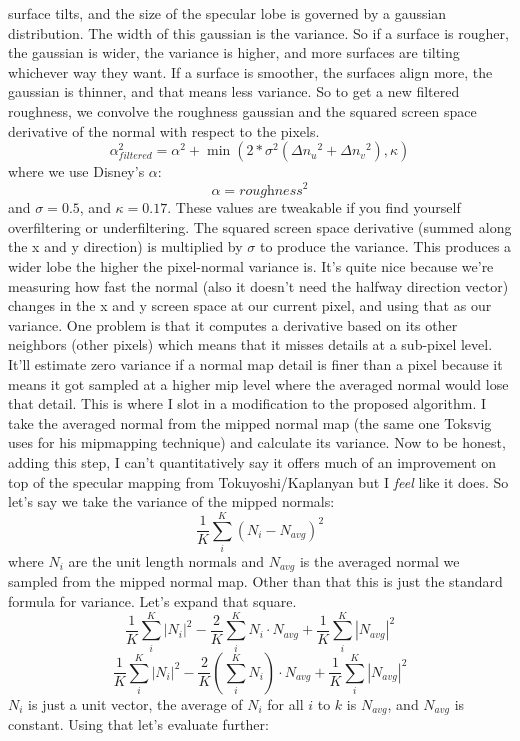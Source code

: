\documentclass{article}
\begin{document}
surface tilts, and the size of the specular lobe is governed by a gaussian distribution. The width of this gaussian is the variance. So if a surface is rougher, the gaussian is wider, the variance is higher, and more surfaces are tilting whichever way they want. If a surface is smoother, the surfaces align more, the gaussian is thinner, and that means less variance. So to get a new filtered roughness, we convolve the roughness gaussian and the squared screen space derivative of the normal with respect to the pixels.
\[\alpha_{\textit{filtered}}^2 = \alpha^{2} + \min(2*\sigma^2({\Delta{n_u}^2 + \Delta{n_v}^2}), \kappa)\]
where we use Disney's \(\alpha\):
\[\alpha = \textit{roughness}^2\]
and \(\sigma = 0.5\), and \(\kappa = 0.17\). These values are tweakable if you find yourself overfiltering or underfiltering. The squared screen space derivative (summed along the x and y direction) is multiplied by \(\sigma\) to produce the variance. This produces a wider lobe the higher the pixel-normal variance is. It's quite nice because we're measuring how fast the normal (also it doesn't need the halfway direction vector) changes in the x and y screen space at our current pixel, and using that as our variance. One problem is that it computes a derivative based on its other neighbors (other pixels) which means that it misses details at a sub-pixel level. It'll estimate zero variance if a normal map detail is finer than a pixel because it means it got sampled at a higher mip level where the averaged normal would lose that detail. This is where I slot in a modification to the proposed algorithm. I take the averaged normal from the mipped normal map (the same one Toksvig uses for his mipmapping technique) and calculate its variance. Now to be honest, adding this step, I can't quantitatively say it offers much of an improvement on top of the specular mapping from Tokuyoshi/Kaplanyan but I \emph{feel} like it does. So let's say we take the variance of the mipped normals:
\[\frac{1}{K} \sum_{i}^{K} (N_i - N_{avg})^2\]
where \(N_i\) are the unit length normals and \(N_{avg}\) is the averaged normal we sampled from the mipped normal map. Other than that this is just the standard formula for variance. Let's expand that square.
\[\frac{1}{K} \sum_{i}^{K} \left|N_i\right|^2 - \frac{2}{K} \sum_{i}^{K} N_i \cdot N_{avg} + \frac{1}{K} \sum_{i}^{K} \left|N_{avg}\right|^2\]
\[\frac{1}{K} \sum_{i}^{K} \left|N_i\right|^2 - \frac{2}{K} (\sum_{i}^{K} N_i) \cdot N_{avg} + \frac{1}{K} \sum_{i}^{K} \left|N_{avg}\right|^2\]
\(N_i\) is just a unit vector, the average of \(N_i\) for all \(i\) to \(k\) is \(N_{avg}\), and \(N_{avg}\) is constant. Using that let's evaluate further:
\end{document}
